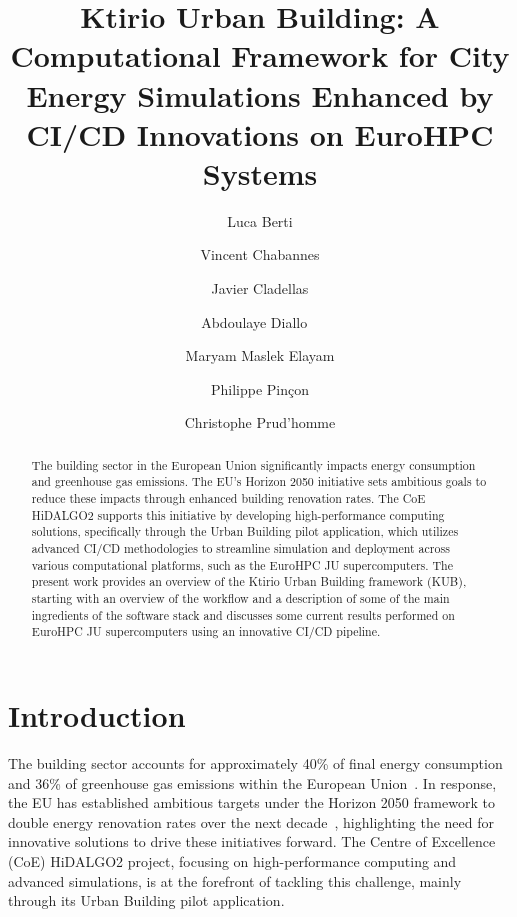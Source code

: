 \documentclass[runningheads]{llncs}
\begin{document}
\title{Ktirio Urban Building: A Computational Framework for City Energy Simulations Enhanced by CI/CD Innovations on EuroHPC Systems}
\author{}
\author{Luca Berti \and Vincent Chabannes  \and
Javier Cladellas  \and 
Abdoulaye Diallo \ \and
Maryam Maslek Elayam  \and
Philippe Pinçon  \and
Christophe Prud'homme}



\maketitle

\begin{abstract}
The building sector in the European Union significantly impacts energy consumption and greenhouse gas emissions. The EU's Horizon 2050 initiative sets ambitious goals to reduce these impacts through enhanced building renovation rates. The CoE HiDALGO2 supports this initiative by developing high-performance computing solutions, specifically through the Urban Building pilot application, which utilizes advanced CI/CD methodologies to streamline simulation and deployment across various computational platforms, such as the EuroHPC JU supercomputers. The present work provides an overview of the Ktirio Urban Building framework (KUB), starting with an overview of the workflow and a description of some of the main ingredients of the software stack and discusses some current results performed on EuroHPC JU supercomputers using an innovative CI/CD pipeline.


\end{abstract}



\section{Introduction}
The building sector accounts for approximately 40\% of final energy consumption and 36\% of greenhouse gas emissions within the European Union~\cite{european_commision_energy_2020}. In response, the EU has established ambitious targets under the Horizon 2050 framework to double energy renovation rates over the next decade~\cite{european_commision_stakeholder_2021}, highlighting the need for innovative solutions to drive these initiatives forward. The Centre of Excellence (CoE) HiDALGO2 project, focusing on high-performance computing and advanced simulations, is at the forefront of tackling this challenge, mainly through its Urban Building pilot application.
\end{document}

